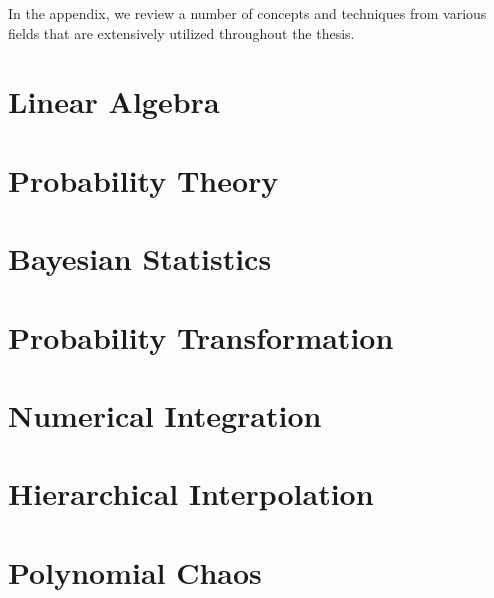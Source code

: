 In the appendix, we review a number of concepts and techniques from various
fields that are extensively utilized throughout the thesis.

\section{Linear Algebra}

\section{Probability Theory}

\section{Bayesian Statistics}

\section{Probability Transformation}

\section{Numerical Integration}

\section{Hierarchical Interpolation}

\section{Polynomial Chaos}

